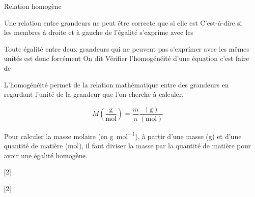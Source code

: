 \vspace*{-8pt}

\begin{doc}{Relation homogène}
  \begin{importants}  
    Une relation entre grandeurs ne peut être correcte que si elle est 
    C'est-à-dire si les membres à droite et à gauche de l'égalité s'exprime avec les 
  \end{importants}
  
  Toute égalité entre deux grandeurs qui ne peuvent pas s'exprimer avec les mêmes unités est donc forcément 
  On dit 
  Vérifier l'homogénéité d'une équation c'est faire de 

  \begin{importants}
    L'homogénéité permet de  la relation mathématique entre des grandeurs en regardant l'unité de la grandeur que l'on cherche à calculer.

    \begin{figure}
      \vspace*{-20pt}
      \begin{equation*}
        M \left(\dfrac{\unit{\g}} {\unit{ \mole}}\right) 
        = \dfrac{m}{n} \dfrac{(\unit{\g})} {(\unit{\mole})}
      \end{equation*}
    \end{figure}

    \exemple Pour calculer la masse molaire (en \unit{\g\per\mole}), à partir d'une masse (\unit{\g}) et d'une quantité de matière (\unit{\mole}), il faut diviser la masse par la quantité de matière pour avoir une égalité homogène.
  \end{importants}
\end{doc}

[2]

[2]
